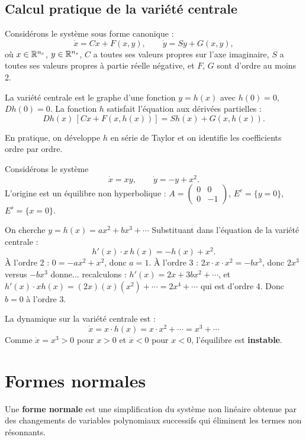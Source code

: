 \subsection{Calcul pratique de la vari\'et\'e centrale}

Consid\'erons le syst\`eme sous forme canonique :
\[
    \dot{x} = Cx + F(x, y), \qquad \dot{y} = Sy + G(x, y),
\]
o\`u $x \in \mathbb{R}^{n_c}$, $y \in \mathbb{R}^{n_s}$, $C$ a toutes ses valeurs propres
sur l'axe imaginaire, $S$ a toutes ses valeurs propres \`a partie r\'eelle
n\'egative, et $F$, $G$ sont d'ordre au moins 2.

La vari\'et\'e centrale est le graphe d'une fonction $y = h(x)$ avec
$h(0) = 0$, $Dh(0) = 0$. La fonction $h$ satisfait l'\'equation aux
d\'eriv\'ees partielles :
\[
    Dh(x)\,[Cx + F(x, h(x))] = Sh(x) + G(x, h(x)).
\]

En pratique, on d\'eveloppe $h$ en s\'erie de Taylor et on identifie les
coefficients ordre par ordre.

\begin{exemple}
Consid\'erons le syst\`eme
\[
    \dot{x} = xy, \qquad \dot{y} = -y + x^2.
\]
L'origine est un \'equilibre non hyperbolique : $A = \begin{pmatrix} 0 & 0 \\ 0 & -1 \end{pmatrix}$,
$E^c = \{y = 0\}$, $E^s = \{x = 0\}$.

On cherche $y = h(x) = ax^2 + bx^3 + \cdots$ Substituant dans l'\'equation
de la vari\'et\'e centrale :
\[
    h'(x) \cdot x\,h(x) = -h(x) + x^2.
\]
\`A l'ordre 2 : $0 = -ax^2 + x^2$, donc $a = 1$.
\`A l'ordre 3 : $2x \cdot x \cdot x^2 = -bx^3$, donc $2x^3$ versus
$-bx^3$ donne... recalculons : $h'(x) = 2x + 3bx^2 + \cdots$, et
$h'(x) \cdot x h(x) = (2x)(x)(x^2) + \cdots = 2x^4 + \cdots$ qui est
d'ordre 4. Donc $b = 0$ \`a l'ordre 3.

La dynamique sur la vari\'et\'e centrale est :
\[
    \dot{x} = x \cdot h(x) = x \cdot x^2 + \cdots = x^3 + \cdots
\]
Comme $\dot{x} = x^3 > 0$ pour $x > 0$ et $\dot{x} < 0$ pour $x < 0$,
l'\'equilibre est \textbf{instable}.
\end{exemple}

\section{Formes normales}

\begin{definition}
Une \textbf{forme normale} est une simplification du syst\`eme non lin\'eaire
obtenue par des changements de variables polynomiaux successifs qui
\'eliminent les termes non r\'esonnants.
\end{definition}

